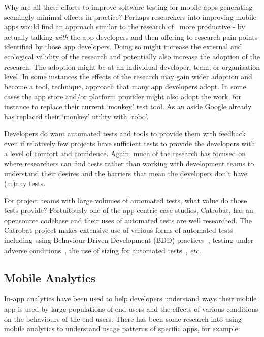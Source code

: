 Why are all these efforts to improve software testing for mobile apps generating seemingly minimal effects in practice? Perhaps researchers into improving mobile apps would find an approach similar to the research of~\textcite{winter2022_lets_talk_with_developers_etc_automatic_program_repair} more productive - by actually talking \emph{with} the app developers and then offering to research pain points identified by those app developers. Doing so might increase the external and ecological validity of the research and potentially also increase the adoption of the research. The adoption might be at an individual developer, team, or organisation level. In some instances the effects of the research may gain wider adoption and become a tool, technique, approach that many app developers adopt. In some cases the app store and/or platform provider might also adopt the work, for instance to replace their current `monkey' test tool. As an aside Google already has replaced their `monkey' utility with `robo'.

Developers do want automated tests and tools to provide them with feedback~\cite[p. 5]{greiler2022_an_actionable_framework_for_understanding_and_improving_developer_experience} even if relatively few projects have sufficient tests to provide the developers with a level of comfort and confidence. Again, much of the research has focused on where researchers can find tests rather than working with development teams to understand their desires and the barriers that mean the developers don't have (m)any tests. 

For project teams with large volumes of automated tests, what value do those tests provide? Fortuitously one of the app-centric case studies, Catrobat, has an opensource codebase and their uses of automated tests are well researched. The Catrobat project makes extensive use of various forms of automated tests including using Behaviour-Driven-Development (BDD) practices~\textcite{ali2019using_catrobat}, testing under adverse conditions~\textcite{adamsen2015systematic_catrobat}, the use of sizing for automated tests~\textcite{hirsch2019approach_catrobat}, \emph{etc}. %

\subsection{Mobile Analytics}
In-app analytics have been used to help developers understand ways their mobile app is used by large populations of end-users and the effects of various conditions on the behaviours of the end users. There has been some research into using mobile analytics to understand usage patterns of specific apps, for example:

